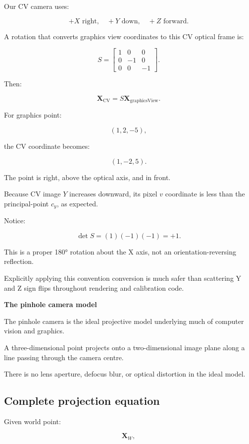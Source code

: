 Our CV camera uses:

\[
 +X\text{ right},\quad+Y\text{ down},\quad+Z\text{ forward}.
\]

A rotation that converts graphics view coordinates to this CV optical frame is:

\[
 \boxed{ S= \begin{bmatrix} 1&0&0\\ 0&-1&0\\ 0&0&-1 \end{bmatrix} }.
\]

Then:

\[
 \boxed{ \mathbf X_{\mathrm{CV}}=S\mathbf X_{\mathrm{graphicsView}} }.
\]

For graphics point:

\[
 (1,2,-5),
\]

the CV coordinate becomes:

\[
 \boxed{(1,-2,5)}.
\]

The point is right, above the optical axis, and in front.

Because CV image \(Y\) increases downward, its pixel \(v\) coordinate is less than the principal-point \(c_y\), as expected.

Notice:

\[
 \det S=(1)(-1)(-1)=+1.
\]

This is a proper 180° rotation about the X axis, not an orientation-reversing reflection.

Explicitly applying this convention conversion is much safer than scattering Y and Z sign flips throughout rendering and calibration code.

\textbf{The pinhole camera model}

The pinhole camera is the ideal projective model underlying much of computer vision and graphics.

A three-dimensional point projects onto a two-dimensional image plane along a line passing through the camera centre.

There is no lens aperture, defocus blur, or optical distortion in the ideal model.

\subsection{Complete projection equation}\label{02-foundations-ii-ch035-complete-projection-equation}

Given world point:

\[
 \mathbf X_W,
\]

